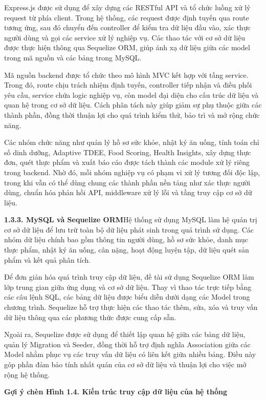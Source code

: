 Express.js được sử dụng để xây dựng các RESTful API và tổ chức luồng xử lý request từ phía client. Trong hệ thống, các request được định tuyến qua route tương ứng, sau đó chuyển đến controller để kiểm tra dữ liệu đầu vào, xác thực người dùng và gọi các service xử lý nghiệp vụ. Các thao tác với cơ sở dữ liệu được thực hiện thông qua Sequelize ORM, giúp ánh xạ dữ liệu giữa các model trong mã nguồn và các bảng trong MySQL.

Mã nguồn backend được tổ chức theo mô hình MVC kết hợp với tầng service. Trong đó, route chịu trách nhiệm định tuyến, controller tiếp nhận và điều phối yêu cầu, service chứa logic nghiệp vụ, còn model đại diện cho cấu trúc dữ liệu và quan hệ trong cơ sở dữ liệu. Cách phân tách này giúp giảm sự phụ thuộc giữa các thành phần, đồng thời thuận lợi cho quá trình kiểm thử, bảo trì và mở rộng chức năng.

Các nhóm chức năng như quản lý hồ sơ sức khỏe, nhật ký ăn uống, tính toán chỉ số dinh dưỡng, Adaptive TDEE, Food Scoring, Health Insights, xây dựng thực đơn, quét thực phẩm và xuất báo cáo được tách thành các module xử lý riêng trong backend. Nhờ đó, mỗi nhóm nghiệp vụ có phạm vi xử lý tương đối độc lập, trong khi vẫn có thể dùng chung các thành phần nền tảng như xác thực người dùng, chuẩn hóa phản hồi API, middleware xử lý lỗi và tầng truy cập cơ sở dữ liệu.

\textbf{1.3.3. MySQL và Sequelize ORM}Hệ thống sử dụng MySQL làm hệ quản trị cơ sở dữ liệu để lưu trữ toàn bộ dữ liệu phát sinh trong quá trình sử dụng. Các nhóm dữ liệu chính bao gồm thông tin người dùng, hồ sơ sức khỏe, danh mục thực phẩm, nhật ký ăn uống, cân nặng, hoạt động luyện tập, dữ liệu quét sản phẩm và kết quả phân tích.

Để đơn giản hóa quá trình truy cập dữ liệu, đề tài sử dụng Sequelize ORM làm lớp trung gian giữa ứng dụng và cơ sở dữ liệu. Thay vì thao tác trực tiếp bằng các câu lệnh SQL, các bảng dữ liệu được biểu diễn dưới dạng các Model trong chương trình. Sequelize hỗ trợ thực hiện các thao tác thêm, sửa, xóa và truy vấn dữ liệu thông qua các phương thức được cung cấp sẵn.

Ngoài ra, Sequelize được sử dụng để thiết lập quan hệ giữa các bảng dữ liệu, quản lý Migration và Seeder, đồng thời hỗ trợ định nghĩa Association giữa các Model nhằm phục vụ các truy vấn dữ liệu có liên kết giữa nhiều bảng. Điều này góp phần đảm bảo tính nhất quán của cơ sở dữ liệu và thuận lợi cho việc mở rộng hệ thống.

\textbf{Gợi ý chèn Hình 1.4. Kiến trúc truy cập dữ liệu của hệ thống}

